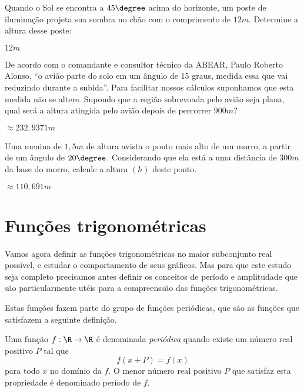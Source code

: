  \begin{exer}
 Quando o Sol se encontra a $45\degree$ acima do horizonte, um poste de iluminação projeta sua sombra no chão com o comprimento de $12 m$. Determine a altura desse poste:
 \end{exer}
\begin{resp}
  $12 m$
\end{resp}

 \begin{exer}
 De acordo com o comandante e consultor técnico da ABEAR, Paulo Roberto Alonso, “o avião parte do solo em um ângulo de 15 graus, medida essa que vai reduzindo durante a subida”. Para facilitar nossos cálculos suponhamos que esta medida não se altere. Supondo que a região sobrevoada pelo avião seja plana, qual será a altura atingida pelo avião depois de percorrer $900 m$?
 \end{exer}
\begin{resp}
  $\approx 232,9371 m$
\end{resp}

 \begin{exer}
 Uma menina de $1,5m$ de altura avista o ponto mais alto de um morro, a partir de um ângulo de $20\degree$. Considerando que ela está a uma distância de $300m$ da base do morro, calcule a altura $(h)$ deste ponto.
 \end{exer}
\begin{resp}
  $\approx 110,691 m$
\end{resp}


\chapter{Funções trigonométricas}
   
 Vamos agora definir as funções trigonométricas no maior subconjunto real possível, e estudar o comportamento de seus gráficos. Mas para que este estudo seja completo precisamos antes definir os conceitos de período e amplitudade que são particularmente utéis para a compreenssão das funções trigonométricas.
 
  Estas funções fazem parte do grupo de funções periódicas, que são as funções que satisfazem a seguinte definição.

  \begin{defi}
   Uma função $f: \R \rightarrow \R$ é denominada \emph{periódica} quando existe um número real positivo $P$ tal que
\begin{equation}
f(x + P)= f(x)
\end{equation}
   para todo $x$ no domínio da $f$. O menor número real positivo $P$ que satisfaz esta propriedade é denominado período de $f$.
  \end{defi}
  
